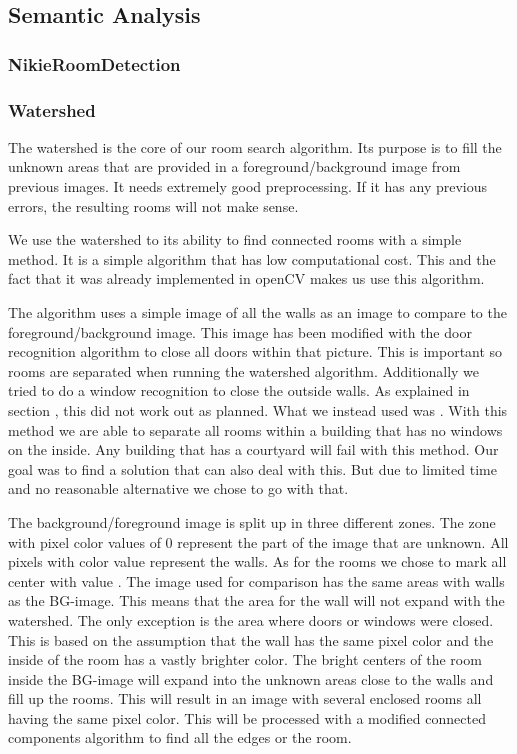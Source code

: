 \subsection{Semantic Analysis}
\subsubsection{NikieRoomDetection}
\subsubsection{Watershed}
The watershed is the core of our room search algorithm. Its purpose is to fill  the unknown areas that are provided in a foreground/background image from previous images. It needs extremely good preprocessing. If it has any previous errors, the resulting rooms will not make sense.

We use the watershed to its ability to find connected rooms with a simple method. It is a simple algorithm that has low computational cost. This and the fact that it was already implemented in openCV makes us use this algorithm.

The algorithm uses a simple image of all the walls as an image to compare to the foreground/background image. This image has been modified with the door recognition algorithm to close all doors within that picture. This is important so rooms are separated when running the watershed algorithm. Additionally we tried to do a window recognition to close the outside walls. As explained in section , this did not work out as planned. What we instead used was . With this method we are able to separate all rooms within a building that has no windows on the inside. Any building that has a courtyard will fail with this method. Our goal was to find a solution that can also deal with this. But due to limited time and no reasonable alternative we chose to go with that.

The background/foreground image is split up in three different zones. The zone with pixel color values of 0 represent the part of the image that are unknown. All pixels with color value  represent the walls. As for the rooms we chose to mark all center with value . The image used for comparison has the same areas with walls as the BG-image. This means that the area for the wall will not expand with the watershed. The only exception is the area where doors or windows were closed. This is based on the assumption that the wall has the same pixel color and the inside of the room has a vastly brighter color.
The bright centers of the room inside the BG-image will expand into the unknown areas close to the walls and fill up the rooms. This will result in an image with several enclosed rooms all having the same pixel color. This will be processed with a modified connected components algorithm to find all the edges or the room.

